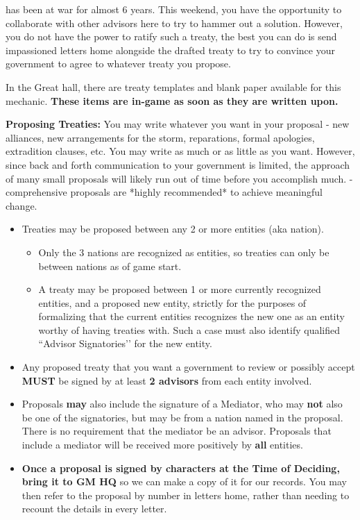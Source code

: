 \documentclass[green]{GL2020}
\begin{document}
\name{\gTreaty{}}

\pEarth{} has been at war for almost 6 years. This weekend, you have the opportunity to collaborate with other advisors here to try to hammer out a solution. However, you do not have the power to ratify such a treaty, the best you can do is send impassioned letters home alongside the drafted treaty to try to convince your government to agree to whatever treaty you propose. 

In the Great hall, there are treaty templates and blank paper available for this mechanic. \textbf{These items are in-game as soon as they are written upon.}

\textbf{Proposing Treaties:}
You may write whatever you want in your proposal - new alliances, new arrangements for the storm, reparations, formal apologies, extradition clauses, etc. You may write as much or as little as you want. However, since back and forth communication to your government is limited, the approach of many small proposals will likely run out of time before you accomplish much. - comprehensive proposals are *highly recommended* to achieve meaningful change.
\begin{itemize}
  \item Treaties may be proposed between any 2 or more entities (aka nation). 
  \begin{itemize}
    \item Only the 3 nations are recognized as entities, so treaties can only be between nations as of game start.
    \item A treaty may be proposed between 1 or more currently recognized entities, and a proposed new entity, strictly for the purposes of formalizing that the current entities recognizes the new one as an entity worthy of having treaties with. Such a case must also identify qualified ``Advisor Signatories’’ for the new entity.
  \end{itemize}
  \item Any proposed treaty that you want a government to review or possibly accept \textbf{MUST} be signed by at least \textbf{2 advisors} from each entity involved.
  \item Proposals \textbf{may} also include the signature of a Mediator, who may \textbf{not} also be one of the signatories, but may be from a nation named in the proposal. There is no requirement that the mediator be an advisor. Proposals that include a mediator will be received more positively by \textbf{all} entities.
  \item \textbf{Once a proposal is signed by characters at the Time of Deciding, bring it to GM HQ} so we can make a copy of it for our records. You may then refer to the proposal by number in letters home, rather than needing to recount the details in every letter.
\end{itemize}
\end{document}
